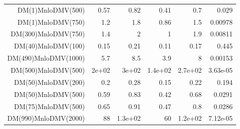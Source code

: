 \begin{table}[hbtp]
\begin{center}
{\begin{tabular}{rrrrrr}
DM(1)MnloDMV(500)         & 0.57         & 0.82         & 0.41         & 0.7          & 0.029           \\
DM(1)MnloDMV(750)         & 1.2          & 1.8          & 0.86         & 1.5          & 0.00978         \\
DM(300)MnloDMV(750)       & 1.4          & 2            & 1            & 1.9          & 0.00811         \\
DM(40)MnloDMV(100)        & 0.15         & 0.21         & 0.11         & 0.17         & 0.445           \\
DM(490)MnloDMV(1000)      & 5.7          & 8.5          & 3.9          & 8            & 0.00153         \\
DM(500)MnloDMV(500)       & 2e+02        & 3e+02        & 1.4e+02      & 2.7e+02      & 3.63e-05        \\
DM(50)MnloDMV(200)        & 0.2          & 0.28         & 0.15         & 0.22         & 0.194           \\
DM(50)MnloDMV(500)        & 0.59         & 0.83         & 0.42         & 0.68         & 0.0291          \\
DM(75)MnloDMV(500)        & 0.65         & 0.91         & 0.47         & 0.8          & 0.0286          \\
DM(990)MnloDMV(2000)      & 88           & 1.3e+02      & 60           & 1.2e+02      & 7.12e-05        \\
\hline 
  \end{tabular}
}
  \end{center}
\end{table}

